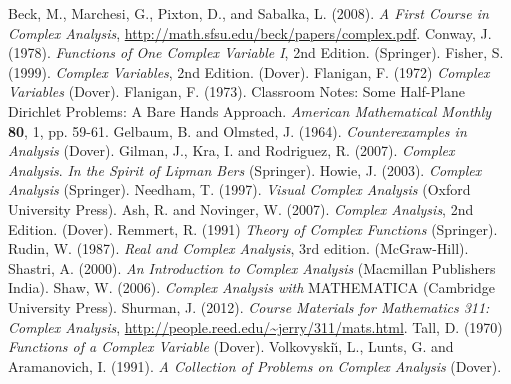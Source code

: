 \documentclass[chapter,10.5pt]{oblivoir}
\numberwithin{equation}{chapter}
\numberwithin{figure}{chapter}
\begin{document}
\begin{thebibliography}{10}

\small

Beck, M., Marchesi, G., Pixton, D., and Sabalka, L. (2008). 
\textit{A First Course in Complex Analysis}, 
\url{http://math.sfsu.edu/beck/papers/complex.pdf}.
Conway, J. (1978). \textit{Functions of One Complex Variable I}, 2nd Edition. (Springer).
Fisher, S. (1999). \textit{Complex Variables}, 2nd Edition. (Dover).
Flanigan, F. (1972) \textit{Complex Variables} (Dover).
Flanigan, F. (1973). Classroom Notes: Some Half-Plane Dirichlet Problems: A
Bare Hands Approach. \textit{American Mathematical Monthly} \textbf{80}, 1, pp. 59-61.
Gelbaum, B. and Olmsted, J. (1964). \textit{Counterexamples in Analysis} (Dover).
Gilman, J., Kra, I. and Rodriguez, R. (2007). 
\textit{Complex Analysis}. \textit{In the Spirit of Lipman Bers} (Springer).
Howie, J. (2003). \textit{Complex Analysis} (Springer).
Needham, T. (1997). \textit{Visual Complex Analysis} (Oxford University Press).
Ash, R. and Novinger, W. (2007). \textit{Complex Analysis}, 2nd Edition. (Dover).
Remmert, R. (1991) \textit{Theory of Complex Functions} (Springer).
Rudin, W. (1987). \textit{Real and Complex Analysis}, 3rd edition. (McGraw-Hill).
Shastri, A. (2000). \textit{An Introduction to Complex Analysis} 
(Macmillan Publishers India).
Shaw, W. (2006). \textit{Complex Analysis with} MATHEMATICA 
(Cambridge University Press).
Shurman, J. (2012). \textit{Course Materials for Mathematics 311: Complex Analysis},
\url{http://people.reed.edu/~jerry/311/mats.html}.
Tall, D. (1970) \textit{Functions of a Complex Variable} (Dover).
Volkovyski\u{\i}, L., Lunts, G. and Aramanovich, I. (1991). 
\textit{A Collection of Problems on Complex Analysis} (Dover).
\end{thebibliography}

\printindex
\end{document}
